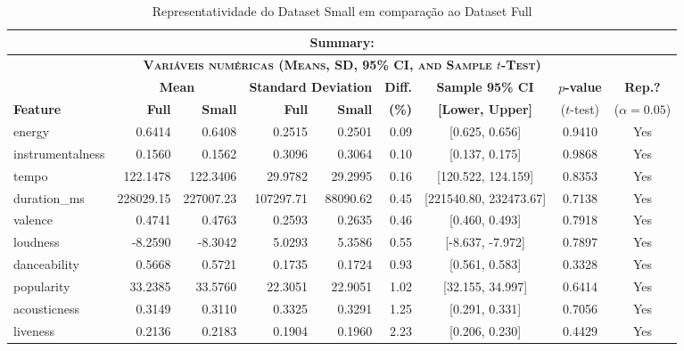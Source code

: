 \documentclass[conference]{IEEEtran}
\begin{document}
\begin{table}[!t]
\centering
\caption{Representatividade do Dataset Small em comparação ao Dataset Full}
\label{tab:representativeness_analysis}
\begin{tabular}{l rr rr r c c c}
\toprule
\multicolumn{9}{c}{\textbf{Summary:}} Total Features = 11 \quad|\quad Statistically Representative = 11 (100.00\%) \\
\midrule
\multicolumn{9}{c}{\textbf{\scshape Variáveis numéricas (Means, SD, 95\% CI, and Sample $t$-Test)}} \\
\midrule
& \multicolumn{2}{c}{\textbf{Mean}} & \multicolumn{2}{c}{\textbf{Standard Deviation}} & \textbf{Diff.} & \textbf{Sample 95\% CI} & \textbf{$p$-value} & \textbf{Rep.?} \\
\cmidrule(lr){2-3} \cmidrule(lr){4-5}
\textbf{Feature} & \textbf{Full} & \textbf{Small} & \textbf{Full} & \textbf{Small} & \textbf{(\%)} & \textbf{[Lower, Upper]} & ($t$-test) & ($\alpha=0.05$) \\
\midrule
energy           & 0.6414     & 0.6408     & 0.2515     & 0.2501    & 0.09 & [0.625, 0.656]         & 0.9410 & Yes \\
instrumentalness & 0.1560     & 0.1562     & 0.3096     & 0.3064    & 0.10 & [0.137, 0.175]         & 0.9868 & Yes \\
tempo            & 122.1478   & 122.3406   & 29.9782    & 29.2995   & 0.16 & [120.522, 124.159]     & 0.8353 & Yes \\
duration\_ms     & 228029.15  & 227007.23  & 107297.71  & 88090.62  & 0.45 & [221540.80, 232473.67] & 0.7138 & Yes \\
valence          & 0.4741     & 0.4763     & 0.2593     & 0.2635    & 0.46 & [0.460, 0.493]         & 0.7918 & Yes \\
loudness         & -8.2590    & -8.3042    & 5.0293     & 5.3586    & 0.55 & [-8.637, -7.972]       & 0.7897 & Yes \\
danceability     & 0.5668     & 0.5721     & 0.1735     & 0.1724    & 0.93 & [0.561, 0.583]         & 0.3328 & Yes \\
popularity       & 33.2385    & 33.5760    & 22.3051    & 22.9051   & 1.02 & [32.155, 34.997]       & 0.6414 & Yes \\
acousticness     & 0.3149     & 0.3110     & 0.3325     & 0.3291    & 1.25 & [0.291, 0.331]         & 0.7056 & Yes \\
liveness         & 0.2136     & 0.2183     & 0.1904     & 0.1960    & 2.23 & [0.206, 0.230]         & 0.4429 & Yes \\

\end{tabular}
\end{table}
\end{document}
